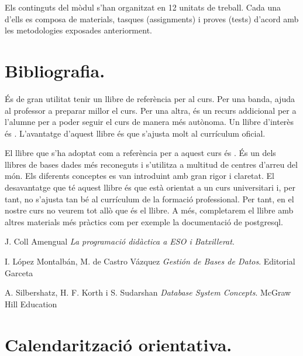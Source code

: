 \documentclass[catalan, a4paper, 12pt, titlepage]{article}
\begin{document}
Els continguts del mòdul s'han organitzat en 12 unitats de treball.
Cada una d'ells es composa de materials, tasques (assignments) i proves (tests) d'acord amb les metodologies exposades anteriorment.

\section{Bibliografia.}

És de gran utilitat tenir un llibre de referència per al curs.
Per una banda, ajuda al professor a preparar millor el curs.
Per una altra, és un recurs addicional per a l'alumne per a poder seguir el curs de manera més autònoma.
Un llibre d'interès és \cite{montalban2014}.
L'avantatge d'aquest llibre és que s'ajusta molt al currículum oficial.

El llibre que s'ha adoptat com a referència per a aquest curs és \cite{silbershatz2020}.
És un dels llibres de bases dades més reconeguts i s'utilitza a multitud de centres d'arreu del món.
Els diferents conceptes es van introduint amb gran rigor i claretat.
El desavantatge que té aquest llibre és que està orientat a un curs universitari i, per tant, no s'ajusta tan bé al currículum de la formació professional.
Per tant, en el nostre curs no veurem tot allò que és el llibre.
A més, completarem el llibre amb altres materials més pràctics com per exemple la documentació de postgresql.

\begin{thebibliography}{9}

J. Coll Amengual
\textit{La programació didàctica a ESO i Batxillerat}. 

I. López Montalbán, M. de Castro Vázquez
\textit{Gestión de Bases de Datos}. 
Editorial Garceta

A. Silbershatz, H. F. Korth i S. Sudarshan 
\textit{Database System Concepts}. 
McGraw Hill Education

\end{thebibliography}


\appendix

\section{Calendarització orientativa.}
\label{app:schedule}
\end{document}
